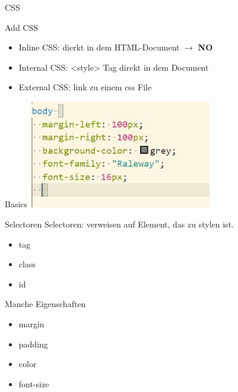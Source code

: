 \documentclass[12pt,xcolor={rgb}]{beamer}
\begin{document}
\begin{frame}{CSS}
\Huge{}
\end{frame}

\begin{frame}{Add CSS}
\begin{itemize}
\item Inline CSS: dierkt in dem HTML-Document $\rightarrow$ \textbf{NO}
\item Internal CSS: <style> Tag direkt in dem Document
\item External CSS: link zu einem css File
\end{itemize}
\end{frame}


\begin{frame}{Basics}
\includegraphics[width=8cm]{imgs/css_basic.JPG} 
\end{frame}


\begin{frame}{Selectoren}
Selectoren: verweisen auf Element, das zu stylen ist. 
\begin{itemize}
\item tag \texttt{\color{green}{h, p, body}}
\item class \texttt{\color{green}{.test--class}}
\item id \texttt{\color{green}{.test--id}}
\end{itemize}
\end{frame}

\begin{frame}{Manche Eigenschaften}
\begin{itemize}
\item margin
\item padding
\item color
\item font-size
\end{itemize}
\end{frame}
\end{document}
